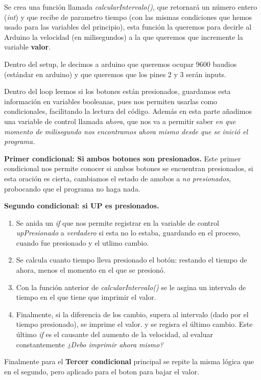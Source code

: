 \documentclass[conference]{IEEEtran}
\begin{document}
  Se crea una función llamada \textit{calcularIntervalo()}, que retornará un número entero (\textit{int}) y que recibe de parametro tiempo (con las mismas condiciones que hemos usado para las variables del principio), esta función la queremos para decirle al Arduino la velocidad (en milisegundos) a la que queremos que incremente la variable \textbf{valor}.

  Dentro del setup, le decimos a arduino que queremos ocupar 9600 baudios (estándar en arduino) y que queremos que los pines 2 y 3 serán inputs.

  Dentro del loop leemos si los botones están presionados, guardamos esta información en variables booleanas, pues nos permiten usarlas como condicionales, facilitando la lectura del código. Además en esta parte añadimos una variable de control llamada  \textit{ahora}, que nos va a permitir saber \textit{en que momento de milisegundo nos encontramos ahora mismo desde que se inició el programa.}

  \textbf{Primer condicional: Si ambos botones son presionados.} Este primer condicional nos permite conocer si ambos botones se encuentran presionados, si esta oración es cierta, cambiamos el estado de amobos a \textit{no presionados}, probocando que el programa no haga nada.

  \textbf{Segundo condicional: si UP es presionados.} 
  \begin{enumerate}
    \item Se anida un \textit{if} que nos permite registrar en la variable de control \textit{upPresionado} a \textit{verdadero} si esta no lo estaba, guardando en el proceso, cuando fue presionado y el utlimo cambio.
    \item Se calcula cuanto tiempo lleva presionado el botón: restando el tiempo de ahora, menos el momento en el que se presionó.
    \item Con la función anterior de \textit{calcularIntervalo()} se le asgina un intervalo de tiempo en el que tiene que imprimir el valor.
    \item Finalmente, si la diferencia de los cambio, supera al intervalo (dado por el tiempo presionado), se imprime el valor. y se regisra el último cambio. Este último \textit{if} es el causante del aumento de la velocidad, al evaluar constantemente \textit{¿Debo imprimir ahora mismo?}
  \end{enumerate}
  
  Finalmente para el \textbf{Tercer condicional} principal se repite la misma lógica que en el segundo, pero aplicado para el boton para bajar el valor.
\end{document}
